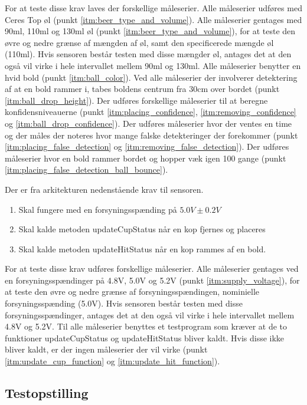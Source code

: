 \documentclass[Modultest/Modultest_main.tex]{subfiles}
\begin{document}
For at teste disse krav laves der forskellige måleserier. Alle måleserier udføres med Ceres Top øl (punkt \ref{itm:beer_type_and_volume}). Alle måleserier gentages med 90ml, 110ml og 130ml øl (punkt \ref{itm:beer_type_and_volume}), for at teste den øvre og nedre grænse af mængden af øl, samt den specificerede mængde øl (110ml). Hvis sensoren består testen med disse mængder øl, antages det at den også vil virke i hele intervallet mellem 90ml og 130ml. Alle måleserier benytter en hvid bold (punkt \ref{itm:ball_color}). Ved alle måleserier der involverer detektering af at en bold rammer i, tabes boldens centrum fra 30cm over bordet (punkt \ref{itm:ball_drop_height}). Der udføres forskellige måleserier til at beregne konfidensniveauerne (punkt \ref{itm:placing_confidence}, \ref{itm:removing_confidence} og \ref{itm:ball_drop_confidence}). Der udføres måleserier hvor der ventes en time og der måles der noteres hvor mange falske detekteringer der forekommer (punkt \ref{itm:placing_false_detection} og \ref{itm:removing_false_detection}). Der udføres måleserier hvor en bold rammer bordet og hopper væk igen 100 gange (punkt \ref{itm:placing_false_detection_ball_bounce}).

Der er fra arkitekturen nedenstående krav til sensoren.
\begin{enumerate}
    \item Skal fungere med en forsyningsspænding på $5.0\si{V} \pm 0.2\si{V}$ \label{itm:supply_voltage}
    \item Skal kalde metoden updateCupStatus når en kop fjernes og placeres \label{itm:update_cup_function}
    \item Skal kalde metoden updateHitStatus når en kop rammes af en bold. \label{itm:update_hit_function}
\end{enumerate}

For at teste disse krav udføres forskellige måleserier. Alle måleserier gentages ved en forsyningsspændinger på 4.8V, 5.0V og 5.2V (punkt \ref{itm:supply_voltage}), for at teste den øvre og nedre grænse af forsyningsspændingen, nominielle forsyningsspænding (5.0V). Hvis sensoren består testen med disse forsyningsspændinger, antages det at den også vil virke i hele intervallet mellem 4.8V og 5.2V. Til alle måleserier benyttes et testprogram som kræver at de to funktioner updateCupStatus og updateHitStatus bliver kaldt. Hvis disse ikke bliver kaldt, er der ingen måleserier der vil virke (punkt \ref{itm:update_cup_function} og \ref{itm:update_hit_function}).

\subsection{Testopstilling}
\end{document}
